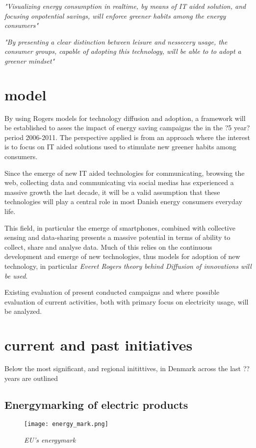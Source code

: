 \documentclass[journal]{IEEEtran}
\begin{document}
\textit{"Visualizing energy consumption in realtime, by means of IT aided solution, and focusing onpotential savings, will enforce greener habits among the energy consumers"}

\textit{"By presenting a clear distinction between leisure and nessecery usage, the consumer groups, capable of adopting this technology, will be able to to adopt a greener mindset"}

\section{model}
By using Rogers models for technology diffusion and adoption, a framework will be established to asses the impact of energy saving campaigns the in the ?5 year? period 2006-2011.
The perspective applied is from an approach where the interest is to focus on IT aided solutions used to stimulate new greener habits among consumers.

Since the emerge of new IT aided technologies for communicating,  browsing the web, collecting data and communicating via social medias has experienced a massive growth the last decade, it will be a valid assumption that these technologies will play a central role in most Danish energy consumers everyday life.

This field, in particular the emerge of smartphones, combined with collective sensing and data-sharing presents a massive potential in terms of ability to collect, share and analyse data. Much of this relies on the continuous development and emerge of new technologies, thus models for adoption of new technology, in particular \textit{Everet Rogers theory behind Diffusion of innovations will be used}.

Existing evaluation of present conducted campaigns and where possible evaluation of current activities, both with primary focus on electricity usage, will be analyzed.


\section{current and past initiatives}
Below the most significant, and regional initittives, in Denmark across the last ?? years are outlined

\subsection{Energymarking of electric products}
\begin{figure}
\texttt{[image: energy\_mark.png]}
\caption{\textit{EU's energymark}}			
\label{fig:emark} %
\end{figure}
\end{document}
